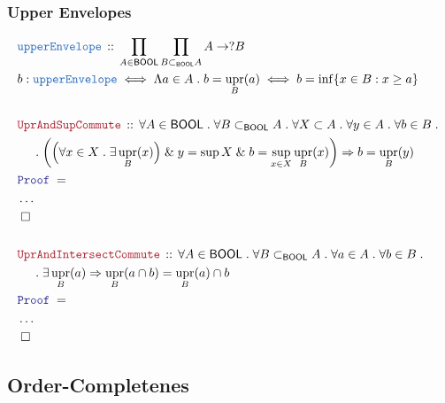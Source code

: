 \documentclass[12pt]{scrartcl}
\newcommand{\TYPE}[1]{\textcolor{NavyBlue}{\mathtt{#1}}}
\newcommand{\LOGIC}[1]{\textcolor{Blue}{\mathtt{#1}}}
\newcommand{\THM}[1]{\textcolor{Maroon}{\mathtt{#1}}}
\renewcommand{\.}{\; . \;}
\newcommand{\Theorem}[2]{& \THM{#1} \, :: \, #2 \\ & \Proof = \\ }
\newcommand{\DeclareType}[2]{& \TYPE{#1} \, :: \, #2 \\}
\newcommand{\DefineNamedType}[4]{& #1 : \TYPE{#2} \iff #3 \iff #4 \\}
\newcommand{\NewLine}{\\ & \kern 1pc}
\newcommand{\Page}[1]{ \begin{align*} #1 \end{align*}   }
\newcommand{\NoProof}{ & \ldots \\ \EndProof}
\renewcommand{\And}{\; \& \;}
\newcommand{\Imply}{\Rightarrow}
\newcommand{\QED}{\; \square}
\newcommand{\EndProof}{& \QED \\}
\newcommand{\Proof}{\LOGIC{Proof} \; }
\DeclareMathOperator{\upr}{upr}
\newcommand{\BOOL}{\mathsf{BOOL}}
\begin{document}
\subsubsection{Upper Envelopes}
\Page{
	\DeclareType{upperEnvelope}{\prod_{A \in \BOOL} \prod_{B \subset_\BOOL A} A \to ?B}
	\DefineNamedType{b}{upperEnvelope}{\Lambda a \in A \. b =\upr_B(a)}
	{
		b = \inf\{ x \in B : x \ge a   \}
	}
	\\
	\Theorem{UprAndSupCommute}
	{
		\forall A \in \BOOL \. 
		\forall B \subset_\BOOL A \.
		\forall X \subset A \.
		\forall y \in A \.
		\forall b \in B \.
		\NewLine \. 
		\bigg(
		\Big( \forall x \in X \. \exists \upr_B(x) \Big) 
		\And y = \sup X \And
		b = \sup_{x \in X} \upr_B(x) 
		\bigg)
		\Imply
		b = \upr_B(y)
	}
	\NoProof
	\\
	\Theorem{UprAndIntersectCommute}
	{
		\forall A \in \BOOL \. 
		\forall B \subset_\BOOL A \.
		\forall a \in A \.
		\forall b \in B \.
		\NewLine \.
		\exists \upr_B(a) \Imply
		\upr_B(a \cap b)  = \upr_B(a) \cap b
	}
	\NoProof
}
\newpage
\subsection{Order-Completenes}
\end{document}
